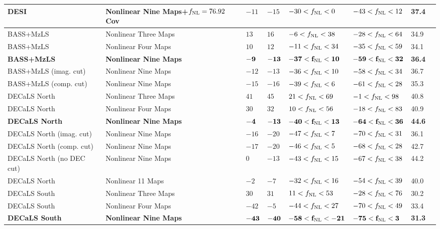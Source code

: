 \begin{table}
{\begin{tabular}{llllllll}
DESI & Nonlinear Nine Maps+$f_{\rm NL}=76.92$ Cov& $   -11$& $   -15$& $   -30<f_{\rm NL}<    0$& $   -43<f_{\rm NL}<    12$ &   37.4\\
   \hline
BASS+MzLS & Nonlinear Three Maps        & $    13$& $    16$& $    -6<f_{\rm NL}<    38$& $   -28<f_{\rm NL}<    64$ &   34.9\\
BASS+MzLS & Nonlinear Four Maps         & $    10$& $    12$& $   -11<f_{\rm NL}<    34$& $   -35<f_{\rm NL}<    59$ &   34.1\\
\bf{BASS+MzLS} & \bf{Nonlinear Nine Maps}         & $    \bf{-9}$& $   \bf{-13}$& $   \bf{-37}<f_{\rm NL}<    \bf{10}$& $   \bf{-59}<f_{\rm NL}<    \bf{32}$ &   \bf{36.4}\\
BASS+MzLS (imag. cut) & Nonlinear Nine Maps& $   -12$& $   -13$& $   -36<f_{\rm NL}<    10$& $   -58<f_{\rm NL}<    34$ &   36.7\\
BASS+MzLS (comp. cut) & Nonlinear Nine Maps& $   -15$& $   -16$& $   -39<f_{\rm NL}<     6$& $   -61<f_{\rm NL}<    28$ &   35.3\\
   \hline
DECaLS North & Nonlinear Three Maps     & $    41$& $    45$& $    21<f_{\rm NL}<    69$& $    -1<f_{\rm NL}<    98$ &   40.8\\
DECaLS North & Nonlinear Four Maps      & $    30$& $    32$& $    10<f_{\rm NL}<    56$& $   -18<f_{\rm NL}<    83$ &   40.9\\
\bf{DECaLS North} & \bf{Nonlinear Nine Maps}      & $    \bf{-4}$& $ \bf{-13}$& $  \bf{-40}<f_{\rm NL}<   \bf{13}$& $   \bf{-64}<f_{\rm NL}<   \bf{36}$ &  \bf{44.6}\\
DECaLS North (imag. cut) & Nonlinear Nine Maps& $   -16$& $   -20$& $   -47<f_{\rm NL}<     7$& $   -70<f_{\rm NL}<    31$ &   36.1\\
DECaLS North (comp. cut) & Nonlinear Nine Maps& $   -17$& $   -20$& $   -46<f_{\rm NL}<     5$& $   -68<f_{\rm NL}<    28$ &   42.7\\
DECaLS North (no DEC cut) & Nonlinear Nine Maps& $     0$& $   -13$& $   -43<f_{\rm NL}<    15$& $   -67<f_{\rm NL}<    38$ &   44.2\\
DECaLS North & Nonlinear 11 Maps        & $    -2$& $    -7$& $   -32<f_{\rm NL}<    16$& $   -54<f_{\rm NL}<    39$ &   40.0\\
   \hline
DECaLS South & Nonlinear Three Maps     & $    30$& $    31$& $    11<f_{\rm NL}<    53$& $   -28<f_{\rm NL}<    76$ &   30.2\\
DECaLS South & Nonlinear Four Maps      & $   -42$& $    -5$& $   -44<f_{\rm NL}<    27$& $   -70<f_{\rm NL}<    49$ &   33.4\\
\bf{DECaLS South} & \bf{Nonlinear Nine Maps}      & $   \bf{-43}$& $  \bf{-40}$& $   \bf{-58}<f_{\rm NL}<  \bf{-21}$& $   \bf{-75}<f_{\rm NL}<    \bf{ 3}$ &  \bf{31.3}\\

\end{tabular}}
\end{table}
